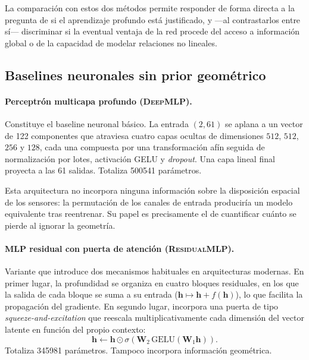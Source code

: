 La comparación con estos dos métodos permite responder de forma directa a la pregunta de si el
aprendizaje profundo está justificado, y ---al contrastarlos entre sí--- discriminar si la eventual
ventaja de la red procede del acceso a información global o de la capacidad de modelar relaciones
no lineales.

\subsection{Baselines neuronales sin prior geométrico}
\label{subsec:baselines-neuronales}

\paragraph{Perceptrón multicapa profundo (\textsc{DeepMLP}).} Constituye el baseline neuronal
básico. La entrada $(2, 61)$ se aplana a un vector de 122 componentes que atraviesa cuatro capas
ocultas de dimensiones $512$, $512$, $256$ y $128$, cada una compuesta por una transformación afín
seguida de normalización por lotes, activación GELU y \emph{dropout}. Una capa lineal final
proyecta a las 61 salidas. Totaliza \num{500541} parámetros.

Esta arquitectura no incorpora ninguna información sobre la disposición espacial de los sensores: la
permutación de los canales de entrada produciría un modelo equivalente tras reentrenar. Su papel es
precisamente el de cuantificar cuánto se pierde al ignorar la geometría.

\paragraph{MLP residual con puerta de atención (\textsc{ResidualMLP}).} Variante que introduce dos
mecanismos habituales en arquitecturas modernas. En primer lugar, la profundidad se organiza en
cuatro bloques residuales, en los que la salida de cada bloque se suma a su entrada
($\mathbf{h} \mapsto \mathbf{h} + f(\mathbf{h})$), lo que facilita la propagación del gradiente. En
segundo lugar, incorpora una puerta de tipo \emph{squeeze-and-excitation} que reescala
multiplicativamente cada dimensión del vector latente en función del propio contexto:
\begin{equation}
    \mathbf{h} \leftarrow \mathbf{h} \odot \sigma\!\left(\mathbf{W}_2\,
    \mathrm{GELU}(\mathbf{W}_1 \mathbf{h})\right).
\end{equation}
Totaliza \num{345981} parámetros. Tampoco incorpora información geométrica.


